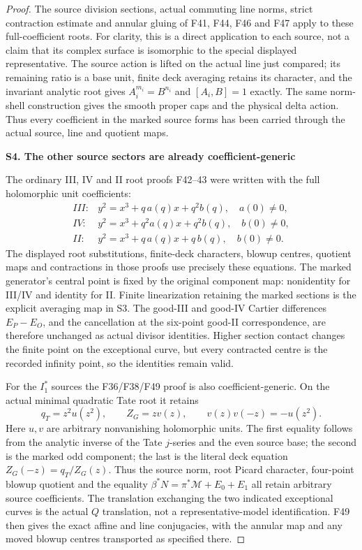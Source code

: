 \begin{proof}
The source division sections, actual commuting line norms,
strict contraction estimate and annular gluing of F41,
F44, F46 and F47 apply to these full-coefficient roots.
For clarity, this is a direct application to each source,
not a claim that its complex surface is isomorphic to the
special displayed representative. The source action is
lifted on the actual line just compared; its remaining
ratio is a base unit, finite deck averaging retains its
character, and the invariant analytic root gives
\(A_i^{m_i}=B^{n_i}\) and \([A_i,B]=1\) exactly.
The same norm-shell construction gives the smooth proper
caps and the physical delta action. Thus every coefficient
in the marked source forms has been carried through
the actual source, line and quotient maps.

\par

\medskip\noindent\textbf{S4. The other source sectors are already coefficient-generic}

\par\nobreak

The ordinary III, IV and II root proofs F42--43 were
written with the full holomorphic unit coefficients:
\[
 \begin{array}{ll}
 III:&y^2=x^3+q\,a(q)x+q^2b(q),\quad a(0)\ne0,\\
 IV:&y^2=x^3+q^2a(q)x+q^2b(q),\quad b(0)\ne0,\\
 II:&y^2=x^3+q\,a(q)x+q\,b(q),\quad b(0)\ne0 .
 \end{array}
 \tag{S51.14}
\]
The displayed root substitutions, finite-deck characters,
blowup centres, quotient maps and contractions in those
proofs use precisely these equations. The marked generator's
central point is fixed by the original component map:
nonidentity for III/IV and identity for II. Finite
linearization retaining the marked sections is the
explicit averaging map in S3. The good-III and good-IV
Cartier differences \(E_P-E_O\), and the cancellation
at the six-point good-II correspondence, are therefore
unchanged as actual divisor identities. Higher section
contact changes the finite point on the exceptional
curve, but every contracted centre is the recorded
infinity point, so the identities remain valid.

For the \(I_1^*\) sources the F36/F38/F49 proof is also
coefficient-generic. On the actual minimal quadratic
Tate root it retains
\[
 q_T=z^2u(z^2),\qquad Z_G=zv(z),\qquad
                  v(z)v(-z)=-u(z^2).
 \tag{S51.15}
\]
Here \(u,v\) are arbitrary nonvanishing holomorphic units.
The first equality follows from the analytic inverse
of the Tate \(j\)-series and the even source base; the
second is the marked odd component; the last is the
literal deck equation \(Z_G(-z)=q_T/Z_G(z)\).
Thus the source norm, root Picard character, four-point
blowup quotient and the equality
\(\beta^*N=\pi^*\mathcal M+E_0+E_1\) all retain arbitrary
source coefficients. The translation exchanging the
two indicated exceptional curves is the actual \(Q\)
translation, not a representative-model identification.
F49 then gives the exact affine and line conjugacies,
with the annular map and any moved blowup centres
transported as specified there.


\end{proof}
